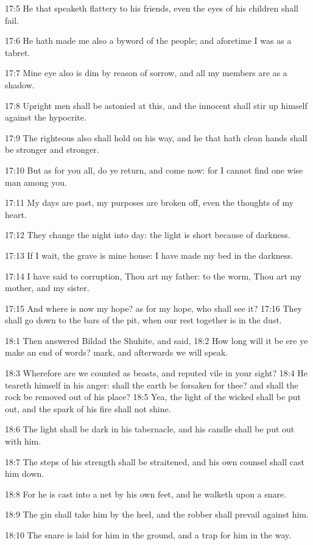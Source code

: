 17:5 He that speaketh flattery to his friends, even the eyes of his
children shall fail.

17:6 He hath made me also a byword of the people; and aforetime I was
as a tabret.

17:7 Mine eye also is dim by reason of sorrow, and all my members are
as a shadow.

17:8 Upright men shall be astonied at this, and the innocent shall
stir up himself against the hypocrite.

17:9 The righteous also shall hold on his way, and he that hath clean
hands shall be stronger and stronger.

17:10 But as for you all, do ye return, and come now: for I cannot
find one wise man among you.

17:11 My days are past, my purposes are broken off, even the thoughts
of my heart.

17:12 They change the night into day: the light is short because of
darkness.

17:13 If I wait, the grave is mine house: I have made my bed in the
darkness.

17:14 I have said to corruption, Thou art my father: to the worm, Thou
art my mother, and my sister.

17:15 And where is now my hope? as for my hope, who shall see it?
17:16 They shall go down to the bars of the pit, when our rest
together is in the dust.

18:1 Then answered Bildad the Shuhite, and said, 18:2 How long will it
be ere ye make an end of words? mark, and afterwards we will speak.

18:3 Wherefore are we counted as beasts, and reputed vile in your
sight?  18:4 He teareth himself in his anger: shall the earth be
forsaken for thee? and shall the rock be removed out of his place?
18:5 Yea, the light of the wicked shall be put out, and the spark of
his fire shall not shine.

18:6 The light shall be dark in his tabernacle, and his candle shall
be put out with him.

18:7 The steps of his strength shall be straitened, and his own
counsel shall cast him down.

18:8 For he is cast into a net by his own feet, and he walketh upon a
snare.

18:9 The gin shall take him by the heel, and the robber shall prevail
against him.

18:10 The snare is laid for him in the ground, and a trap for him in
the way.

